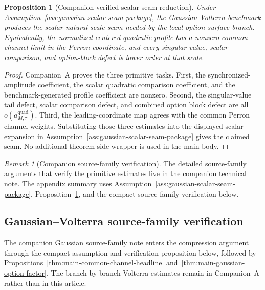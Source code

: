 \documentclass[11pt,a4paper]{amsart}
\theoremstyle{plain}
\newtheorem{proposition}[theorem]{Proposition}
\theoremstyle{definition}
\theoremstyle{remark}
\newtheorem{remark}[theorem]{Remark}
\begin{document}
\begin{proposition}[Companion-verified scalar seam reduction]\label{thm:main-benchmark-model-to-seam}
Under Assumption~\ref{ass:gaussian-scalar-seam-package}, the Gaussian-Volterra benchmark produces
the scalar natural-scale seam needed by the local option-surface branch.  Equivalently, the
normalized centered quadratic profile has a nonzero common-channel limit in the Perron
coordinate, and every singular-value, scalar-comparison, and option-block defect is lower order at
that scale.
\end{proposition}

\begin{proof}
Companion~A proves the three primitive tasks.  First, the synchronized-amplitude coefficient,
the scalar quadratic comparison coefficient, and the benchmark-generated profile coefficient are
nonzero.  Second, the singular-value tail defect, scalar comparison defect, and combined option
block defect are all \(o(a_{M,\tau}^{\mathrm{quad}})\).  Third, the leading-coordinate map agrees
with the common Perron channel weights.  Substituting those three estimates into the displayed
scalar expansion in Assumption~\ref{ass:gaussian-scalar-seam-package} gives the claimed seam.  No
additional theorem-side wrapper is used in the main body.
\end{proof}

\begin{remark}[Companion source-family verification]\label{rem:companion-source-family-ledger}
The detailed source-family arguments that verify the primitive estimates live in the companion
technical note.  The appendix summary uses Assumption~\ref{ass:gaussian-scalar-seam-package},
Proposition~\ref{thm:main-benchmark-model-to-seam}, and the compact source-family verification below.
\end{remark}

\subsection{Gaussian--Volterra source-family verification}
\label{subsec:gaussian-public-route-ledger}

The companion Gaussian source-family note enters the compression argument through the compact assumption
and verification proposition below, followed by
Propositions~\ref{thm:main-common-channel-headline} and~\ref{thm:main-gaussian-option-factor}.  The
branch-by-branch Volterra estimates remain in Companion~A rather than in this article.
\end{document}
